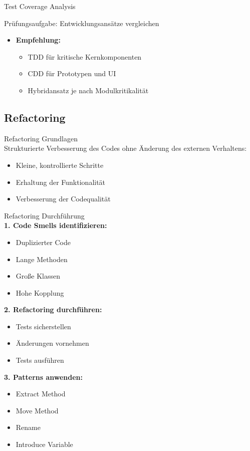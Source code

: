 \begin{example2}{Test Coverage Analysis}
\begin{example2}{Prüfungsaufgabe: Entwicklungsansätze vergleichen}
\begin{itemize}
    \item \textbf{Empfehlung:}
    \begin{itemize}
        \item TDD für kritische Kernkomponenten
        \item CDD für Prototypen und UI
        \item Hybridansatz je nach Modulkritikalität
    \end{itemize}
\end{itemize}
\end{example2}

\subsection{Refactoring}

\begin{definition}{Refactoring Grundlagen}\\
Strukturierte Verbesserung des Codes ohne Änderung des externen Verhaltens:
\begin{itemize}
    \item Kleine, kontrollierte Schritte
    \item Erhaltung der Funktionalität
    \item Verbesserung der Codequalität
\end{itemize}
\end{definition}

\begin{KR}{Refactoring Durchführung}\\
\textbf{1. Code Smells identifizieren:}
\begin{itemize}
    \item Duplizierter Code
    \item Lange Methoden
    \item Große Klassen
    \item Hohe Kopplung
\end{itemize}

\textbf{2. Refactoring durchführen:}
\begin{itemize}
    \item Tests sicherstellen
    \item Änderungen vornehmen
    \item Tests ausführen
\end{itemize}

\textbf{3. Patterns anwenden:}
\begin{itemize}
    \item Extract Method
    \item Move Method
    \item Rename
    \item Introduce Variable
\end{itemize}
\end{KR}


\end{example2}

